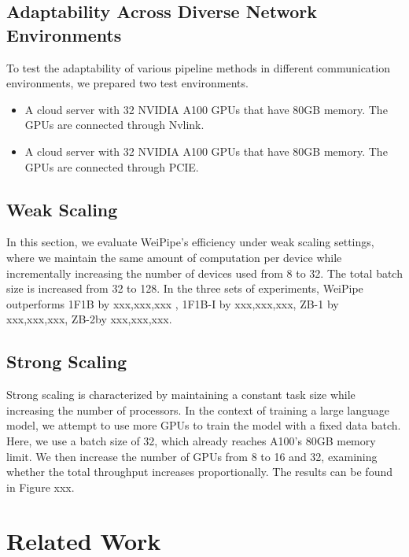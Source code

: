 \documentclass[sigplan,screen]{acmart}
\begin{document}

\subsection{Adaptability Across Diverse Network Environments}
To test the adaptability of various pipeline methods in different communication environments, we prepared two test environments. 

\begin{itemize}
    \item A cloud server with 32 NVIDIA A100 GPUs that have 80GB memory. The GPUs are connected through Nvlink.
    \item A cloud server with 32 NVIDIA A100 GPUs that have 80GB memory. The GPUs are connected through PCIE. 
\end{itemize}


\subsection{Weak Scaling}
In this section, we evaluate WeiPipe’s efficiency under weak scaling settings, where we maintain the same amount of computation per device while incrementally increasing the number of devices used from 8 to 32.
The total batch size is increased from 32 to 128. In the three sets of experiments, WeiPipe outperforms 1F1B by xxx,xxx,xxx , 1F1B-I by xxx,xxx,xxx, ZB-1 by xxx,xxx,xxx, ZB-2by xxx,xxx,xxx.  

\subsection{Strong Scaling}
Strong scaling is characterized by maintaining a constant task size while increasing the number of processors. In the context of training a large language model, we attempt to use more GPUs to train the model with a fixed data batch. Here, we use a batch size of 32, which already reaches A100's 80GB memory limit. We then increase the number of GPUs from 8 to 16 and 32, examining whether the total throughput increases proportionally. The results can be found in Figure xxx. 


\section{Related Work}
\end{document}
